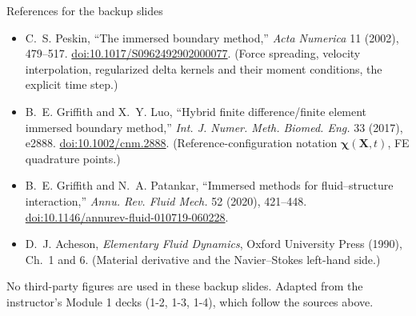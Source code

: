 \documentclass[aspectratio=169,11pt]{beamer}
\begin{document}
\begin{frame}{References for the backup slides}
\footnotesize
\begin{itemize}\itemsep5pt
\item C.~S. Peskin, ``The immersed boundary method,'' \emph{Acta Numerica} 11 (2002), 479--517.
  \href{https://doi.org/10.1017/S0962492902000077}{doi:10.1017/S0962492902000077}.
  (Force spreading, velocity interpolation, regularized delta kernels and their moment conditions, the explicit time step.)
\item B.~E. Griffith and X.~Y. Luo, ``Hybrid finite difference/finite element immersed boundary method,''
  \emph{Int. J. Numer. Meth. Biomed. Eng.} 33 (2017), e2888.
  \href{https://doi.org/10.1002/cnm.2888}{doi:10.1002/cnm.2888}.
  (Reference-configuration notation $\boldsymbol\chi(\mathbf X,t)$, FE quadrature points.)
\item B.~E. Griffith and N.~A. Patankar, ``Immersed methods for fluid--structure interaction,''
  \emph{Annu. Rev. Fluid Mech.} 52 (2020), 421--448.
  \href{https://doi.org/10.1146/annurev-fluid-010719-060228}{doi:10.1146/annurev-fluid-010719-060228}.
\item D.~J. Acheson, \emph{Elementary Fluid Dynamics}, Oxford University Press (1990), Ch.~1 and 6.
  (Material derivative and the Navier--Stokes left-hand side.)
\end{itemize}
\medskip
{\scriptsize\color{DarkGray}No third-party figures are used in these backup slides. Adapted from the instructor's Module 1 decks (1-2, 1-3, 1-4), which follow the sources above.\par}
\end{frame}
\end{document}
